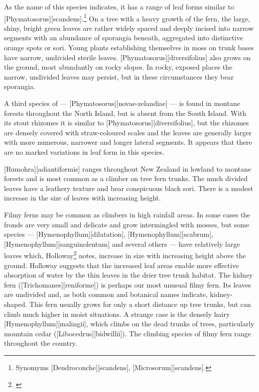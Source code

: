 As the name of this species indicates, it has a range of leaf forms similar to [Phymatosorus][scandens].\footnote{Synomyms [Dendroconche][scandens], [Microsorum][scandens].}
On a tree with a heavy growth of the fern, the large, shiny, bright green leaves are rather widely spaced and deeply incised into narrow segments with an abundance of sporangia beneath, aggregated into distinctive orange spots or sori.
Young plants establishing themselves in moss on trunk bases have narrow, undivided sterile leaves. [Phymatosorus][diversifolius] also grows on the ground, most abundantly on rocky slopes.
In rocky, exposed places the narrow, undivided leaves may persist, but in these circumstances they bear sporangia.

A third species of  --- [Phymatosorus][novae-zelandiae] --- is found in montane forests throughout the North Island, but is absent from the South Island.
With its stout rhizomes it is similar to [Phymatosorus][diversifolius], but the rhizomes are densely covered with straw-coloured scales and the leaves are generally larger with more numerous, narrower and longer lateral segments.
It appears that there are no marked variations in leaf form in this species.

[Rumohra][adiantiformis] ranges throughout New Zealand in lowland to montane forests and is most common as a climber on tree fern trunks.
The much divided leaves have a leathery texture and bear conspicuous black sori.
There is a modest increase in the size of leaves with increasing height.

Filmy ferns may be common as climbers in high rainfall areas.
In some cases the fronds are very small and delicate and grow intermingled with mosses, but some species --- [Hymenophyllum][dilatation], [Hymenophyllum][scabrum], [Hymenophyllum][sanguinolentum] and several others --- have relatively large leaves which, Holloway\footnote{\cite{holloway1923studies}} notes, increase in size with increasing height above the ground.
Holloway suggests that the increased leaf areas enable more effective absorption of water by the thin leaves in the drier tree trunk habitat.
The kidney fern ([Trichomanes][reniforme]) is perhaps our most unusual filmy fern.
Its leaves are undivided and, as both common and botanical names indicate, kidney-shaped.
This fern usually grows for only a short distance up tree trunks, but can climb much higher in moist situations.
A strange case is the densely hairy [Hymenophyllum][malingii], which climbs on the dead trunks of trees, particularly mountain cedar ([Libocedrus][bidwillii]).
The climbing species of filmy fern range throughout the country.

